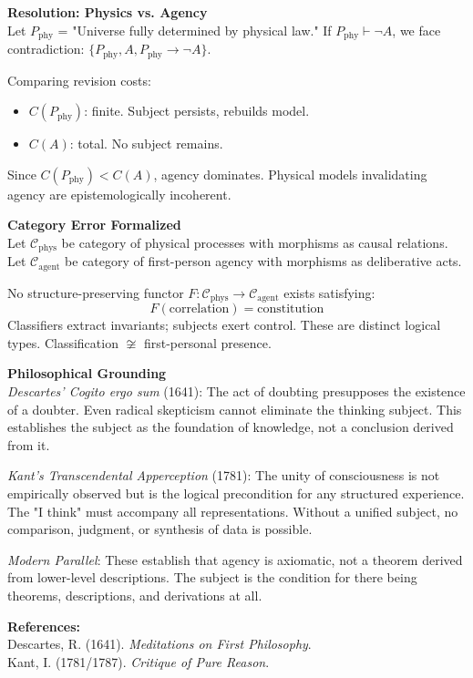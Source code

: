 \begin{technical}
\textbf{Resolution: Physics vs. Agency}\\[0.1em]
Let $P_{\text{phy}}$ = "Universe fully determined by physical law." If $P_{\text{phy}} \vdash \neg A$, we face contradiction: $\{P_{\text{phy}}, A, P_{\text{phy}} \to \neg A\}$.

Comparing revision costs:
\begin{itemize}[leftmargin=*,topsep=0pt,itemsep=1pt]
    \item $C(P_{\text{phy}})$: finite. Subject persists, rebuilds model.
    \item $C(A)$: total. No subject remains.
\end{itemize}

Since $C(P_{\text{phy}}) < C(A)$, agency dominates. Physical models invalidating agency are epistemologically incoherent.

\textbf{Category Error Formalized}\\[0.1em]
Let $\mathcal{C}_{\text{phys}}$ be category of physical processes with morphisms as causal relations. Let $\mathcal{C}_{\text{agent}}$ be category of first-person agency with morphisms as deliberative acts.

No structure-preserving functor $F: \mathcal{C}_{\text{phys}} \to \mathcal{C}_{\text{agent}}$ exists satisfying:
\[
F(\text{correlation}) = \text{constitution}
\]
Classifiers extract invariants; subjects exert control. These are distinct logical types. Classification $\not\cong$ first-personal presence.

\textbf{Philosophical Grounding}\\[0.1em]
\textit{Descartes' Cogito ergo sum} (1641): The act of doubting presupposes the existence of a doubter. Even radical skepticism cannot eliminate the thinking subject. This establishes the subject as the foundation of knowledge, not a conclusion derived from it.

\textit{Kant's Transcendental Apperception} (1781): The unity of consciousness is not empirically observed but is the logical precondition for any structured experience. The "I think" must accompany all representations. Without a unified subject, no comparison, judgment, or synthesis of data is possible.

\textit{Modern Parallel}: These establish that agency is axiomatic, not a theorem derived from lower-level descriptions. The subject is the condition for there being theorems, descriptions, and derivations at all.

\vspace{0.2em}
\textbf{References:}\\
{\footnotesize
Descartes, R. (1641). \textit{Meditations on First Philosophy}.\\
Kant, I. (1781/1787). \textit{Critique of Pure Reason}.
}
\end{technical}